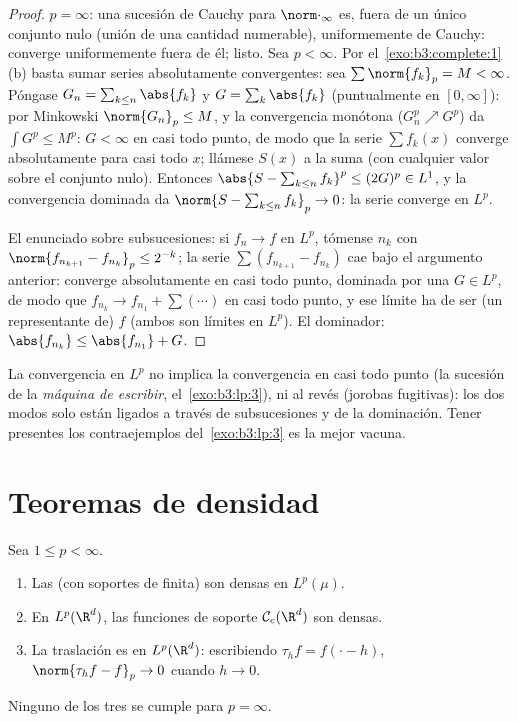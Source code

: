 \begin{proof}
$p = \infty$: una sucesión de Cauchy para $\norm\cdot_\infty$ es, fuera
de un único conjunto nulo (unión de una cantidad numerable),
uniformemente de Cauchy: converge uniformemente fuera de él; listo. Sea
$p < \infty$. Por el~\cref{exo:b3:complete:1}(b) basta sumar series
absolutamente convergentes: sea $\sum\norm{f_k}_p = M < \infty$. Póngase
$G_n = \sum_{k \leq n}\abs{f_k}$ y $G = \sum_k\abs{f_k}$ (puntualmente
en $[0,\infty]$): por Minkowski $\norm{G_n}_p \leq
M$, y la convergencia monótona ($G_n^p \nearrow G^p$) da
$\int G^p \leq M^p$: $G < \infty$ en casi todo punto, de modo que la
serie $\sum f_k(x)$ converge absolutamente para casi todo $x$; llámese
$S(x)$ a la suma (con cualquier valor sobre el conjunto nulo). Entonces
$\abs{S - \sum_{k\leq n}f_k}^p \leq (2G)^p
\in L^1$, y la convergencia dominada da
$\norm{S - \sum_{k\leq n}f_k}_p \to 0$: la serie converge en $L^p$.

El enunciado sobre subsucesiones: si $f_n \to f$ en $L^p$, tómense $n_k$
con $\norm{f_{n_{k+1}} - f_{n_k}}_p \leq 2^{-k}$; la serie
$\sum(f_{n_{k+1}} - f_{n_k})$ cae bajo el argumento anterior: converge
absolutamente en casi todo punto, dominada por una $G \in
L^p$, de modo que $f_{n_k} \to f_{n_1} + \sum(\cdots) $ en casi todo
punto, y ese límite ha de ser (un representante de) $f$ (ambos son
límites en $L^p$). El dominador: $\abs{f_{n_k}} \leq \abs{f_{n_1}} + G$.
\end{proof}

\begin{remark}\label{rem:b3:lp:modes}
La convergencia en $L^p$ no implica la convergencia en casi todo punto
(la sucesión de la \emph{máquina de escribir}, el~\cref{exo:b3:lp:3}),
ni al revés (jorobas fugitivas): los dos modos solo están ligados a
través de subsucesiones y de la dominación. Tener presentes los
contraejemplos del~\cref{exo:b3:lp:3} es la mejor vacuna.
\end{remark}

\section{Teoremas de densidad}

\begin{theorem}\label{thm:b3:lp:density}
Sea $1 \leq p < \infty$.
\begin{enumerate}
  \item Las  (con
  soportes de  finita) son densas
  en $L^p(\mu)$. \item En $L^p(\R^d)$, las funciones
   de soporte 
  $\mathcal C_c(\R^d)$ son densas. \item La traslación es
   en $L^p(\R^d)$:
  escribiendo
        $\tau_hf = f(\cdot - h)$, $\norm{\tau_hf - f}_p \to 0$
        cuando $h \to 0$.
\end{enumerate}
Ninguno de los tres se cumple para $p = \infty$.
\end{theorem}

